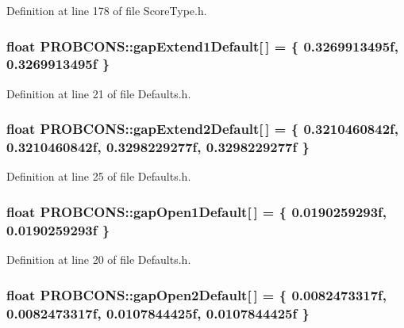 Definition at line 178 of file Score\+Type.\+h.

\hypertarget{namespace_p_r_o_b_c_o_n_s_a833e6c5dcb9594b964de8651c139d655}{
\subsubsection[{gap\+Extend1\+Default}]{\setlength{\rightskip}{0pt plus 5cm}float P\+R\+O\+B\+C\+O\+N\+S\+::gap\+Extend1\+Default\mbox{[}$\,$\mbox{]} = \{ 0.\+3269913495f, 0.\+3269913495f \}}}\label{namespace_p_r_o_b_c_o_n_s_a833e6c5dcb9594b964de8651c139d655}


Definition at line 21 of file Defaults.\+h.

\hypertarget{namespace_p_r_o_b_c_o_n_s_a1880db9507d0a694a8858b86c81c91ed}{
\subsubsection[{gap\+Extend2\+Default}]{\setlength{\rightskip}{0pt plus 5cm}float P\+R\+O\+B\+C\+O\+N\+S\+::gap\+Extend2\+Default\mbox{[}$\,$\mbox{]} = \{ 0.\+3210460842f, 0.\+3210460842f, 0.\+3298229277f, 0.\+3298229277f \}}}\label{namespace_p_r_o_b_c_o_n_s_a1880db9507d0a694a8858b86c81c91ed}


Definition at line 25 of file Defaults.\+h.

\hypertarget{namespace_p_r_o_b_c_o_n_s_a5b6da1afa90c7279231be6813ac26c37}{
\subsubsection[{gap\+Open1\+Default}]{\setlength{\rightskip}{0pt plus 5cm}float P\+R\+O\+B\+C\+O\+N\+S\+::gap\+Open1\+Default\mbox{[}$\,$\mbox{]} = \{ 0.\+0190259293f, 0.\+0190259293f \}}}\label{namespace_p_r_o_b_c_o_n_s_a5b6da1afa90c7279231be6813ac26c37}


Definition at line 20 of file Defaults.\+h.

\hypertarget{namespace_p_r_o_b_c_o_n_s_a7b3932227ab3389404600ec5c3609d0d}{
\subsubsection[{gap\+Open2\+Default}]{\setlength{\rightskip}{0pt plus 5cm}float P\+R\+O\+B\+C\+O\+N\+S\+::gap\+Open2\+Default\mbox{[}$\,$\mbox{]} = \{ 0.\+0082473317f, 0.\+0082473317f, 0.\+0107844425f, 0.\+0107844425f \}}}\label{namespace_p_r_o_b_c_o_n_s_a7b3932227ab3389404600ec5c3609d0d}


